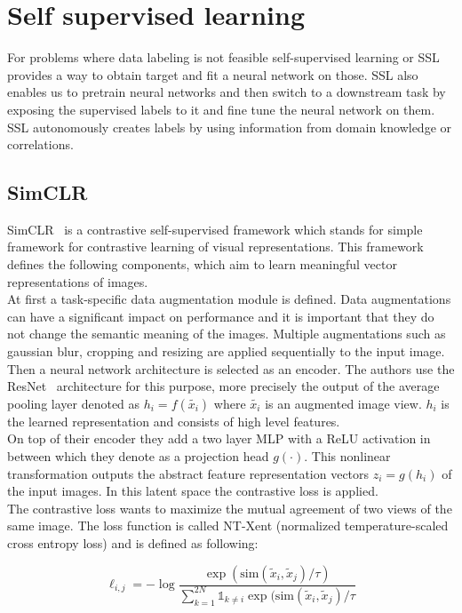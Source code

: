 \documentclass{article}
\begin{document}
\section{Self supervised learning}
For problems where data labeling is not feasible self-supervised learning or SSL
provides a way to obtain target and fit a neural network on those. SSL also enables us
to pretrain neural networks and then switch to a downstream task by exposing the
supervised labels to it and fine tune the neural network on them. SSL autonomously creates
labels by using information from domain knowledge or correlations.\newline

\subsection{SimCLR}

SimCLR~\cite{DBLP:journals/corr/abs-2002-05709} is a contrastive self-supervised framework which stands for simple framework for contrastive learning of visual representations.
This framework defines the following components, which aim to learn  meaningful vector representations of images.\\
At first a task-specific data augmentation module is defined. Data augmentations can have a significant impact on performance and it is important that they do not change the semantic meaning of the images. 
Multiple augmentations such as gaussian blur, cropping and resizing are applied sequentially to the input image.\\
Then a neural network architecture is selected as an encoder.
The authors use the ResNet~\cite{he2015deep} architecture for this purpose, more precisely the output of the average pooling layer denoted as $h_i = f(\tilde{x_i})$ where $\tilde{x_i}$ is an augmented image view. $h_i$ is the learned representation and consists of
high level features.\\
On top of their encoder they add a two layer MLP with a ReLU activation in between which they denote as a projection head $g(\cdot)$. This nonlinear transformation outputs the abstract feature representation vectors $z_i = g(h_i)$ of the input images. In this latent space the contrastive loss is applied.\\
The contrastive loss wants to maximize the mutual agreement of two views of the same image. The loss function is called NT-Xent (normalized temperature-scaled cross entropy loss) and is defined as following:

\begin{equation}
    \ell_{i,j} = -\log \frac{\exp(\mathrm{sim}(\tilde{x}_i, \tilde{x}_j)/\tau)}{\sum_{k=1}^{2N} \mathds{1}_{k \neq i} \exp(\mathrm{sim}(\tilde{x}_i, \tilde{x}_j)/\tau}
\end{equation}
\end{document}
